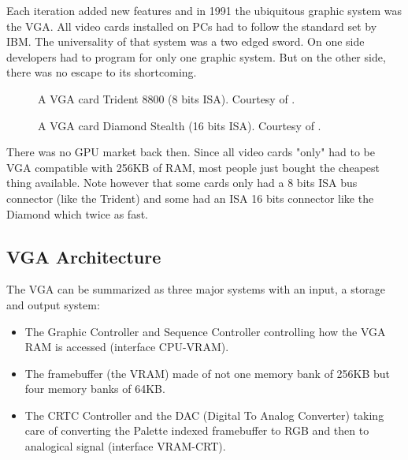 \documentclass[book.tex]{subfiles}
\begin{document}
Each iteration added new features and in 1991 the ubiquitous graphic system was the VGA. All video cards installed on PCs had to follow the standard set by IBM. The universality of that system was a two edged sword. On one side developers had to program for only one graphic system. But on the other side, there was no escape to its shortcoming.\\

\begin{figure}[H] 
  \centering 
  \caption{A VGA card Trident 8800 (8 bits ISA). Courtesy of .}
\end{figure}
\par
\begin{figure}[H] 
  \centering 
  \caption{A VGA card Diamond Stealth (16 bits ISA). Courtesy of .}
\end{figure}
 There was no GPU market back then. Since all video cards "only" had to be VGA compatible with 256KB of RAM, most people just bought the cheapest thing available. Note however that some cards only had a 8 bits ISA bus connector (like the Trident) and some had an ISA 16 bits connector like the Diamond which twice as fast.\\
\par




\subsection{VGA Architecture}

The VGA can be summarized as three major systems with an input, a storage and output system:\\

\begin{itemize}
\item The Graphic Controller and Sequence Controller controlling how the VGA RAM is accessed (interface CPU-VRAM).
\item The framebuffer (the VRAM) made of not one memory bank of 256KB but four memory banks of 64KB.
\item The CRTC Controller and the DAC (Digital To Analog Converter) taking care of converting the Palette indexed framebuffer to RGB and then to analogical signal (interface VRAM-CRT).
\end{itemize}
\end{document}
